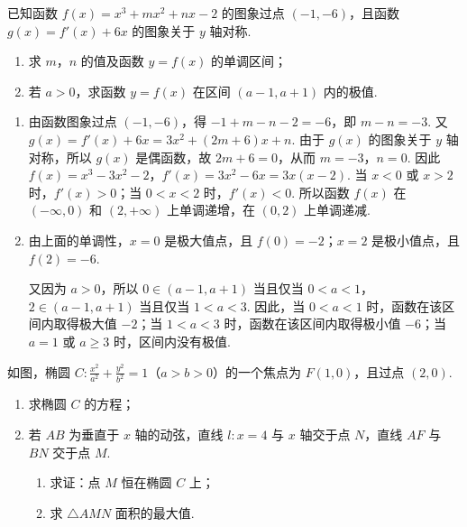 \begin{problem}
已知函数 \(f(x) = x^3 + mx^2 + nx - 2\) 的图象过点 \((-1, -6)\)，且函数 \(g(x) = f'(x) + 6x\) 的图象关于 \(y\) 轴对称.

\begin{enumerate}
\item 求 \(m\)，\(n\) 的值及函数 \(y = f(x)\) 的单调区间；
\item 若 \(a > 0\)，求函数 \(y = f(x)\) 在区间 \((a - 1, a + 1)\) 内的极值.
\end{enumerate}
\end{problem}

\begin{solution}
\begin{enumerate}
\item 由函数图象过点 \((-1,-6)\)，得 \(-1+m-n-2=-6\)，即 \(m-n=-3\).
又 \(g(x)=f'(x)+6x=3x^2+(2m+6)x+n\).
由于 \(g(x)\) 的图象关于 \(y\) 轴对称，所以 \(g(x)\) 是偶函数，故 \(2m+6=0\)，从而
\(m=-3\)，\(n=0\).
因此
\(f(x)=x^3-3x^2-2\)，\(f'(x)=3x^2-6x=3x(x-2)\).
当 \(x<0\) 或 \(x>2\) 时，\(f'(x)>0\)；当 \(0<x<2\) 时，\(f'(x)<0\). 所以函数 \(f(x)\) 在 \((-\infty,0)\) 和 \((2,+\infty)\) 上单调递增，在 \((0,2)\) 上单调递减.
\item 由上面的单调性，\(x=0\) 是极大值点，且 \(f(0)=-2\)；\(x=2\) 是极小值点，且 \(f(2)=-6\).

又因为 \(a>0\)，所以 \(0\in(a-1,a+1)\) 当且仅当 \(0<a<1\)，\(2\in(a-1,a+1)\) 当且仅当 \(1<a<3\).
因此，当 \(0<a<1\) 时，函数在该区间内取得极大值 \(-2\)；当 \(1<a<3\) 时，函数在该区间内取得极小值 \(-6\)；当 \(a=1\) 或 \(a\geqslant3\) 时，区间内没有极值.
\end{enumerate}
\end{solution}

\begin{problem}
如图，椭圆 \(C: \frac{x^2}{a^2} + \frac{y^2}{b^2} = 1\)（\(a > b > 0\)）的一个焦点为 \(F(1,0)\)，且过点 \((2,0)\).

\begin{enumerate}
\item 求椭圆 \(C\) 的方程；
\item 若 \(AB\) 为垂直于 \(x\) 轴的动弦，直线 \(l: x = 4\) 与 \(x\) 轴交于点 \(N\)，直线 \(AF\) 与 \(BN\) 交于点 \(M\).

\begin{enumerate}
\item 求证：点 \(M\) 恒在椭圆 \(C\) 上；
\item 求 \(\triangle AMN\) 面积的最大值.
\end{enumerate}

\end{enumerate}
\end{problem}

